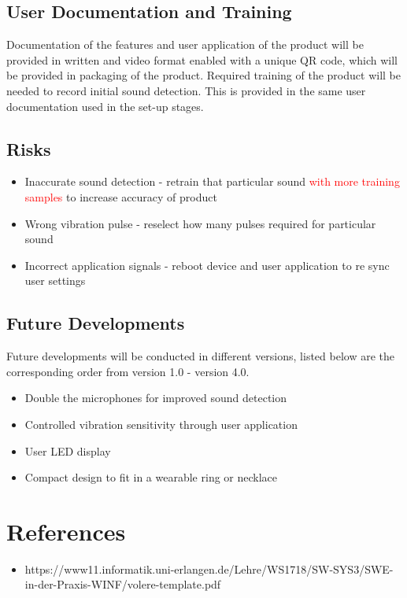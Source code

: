 \documentclass[12pt]{article}
\begin{document}
\raggedright

\subsection{User Documentation and Training}

Documentation of the features and user application of the product will be provided in written and video format enabled with a unique QR code, which will be provided in packaging of the product.
Required training of the product will be needed to record initial sound detection. This is provided in the same user documentation used in the set-up stages.

\subsection{Risks}

\begin{itemize}
  \item Inaccurate sound detection - retrain that particular sound \textcolor{red}{with more training samples} to increase accuracy of product
  \item Wrong vibration pulse - reselect how many pulses required for particular sound
  \item Incorrect application signals - reboot device and user application to re sync user settings
\end{itemize}

\subsection{Future Developments}

Future developments will be conducted in different versions, listed below are the corresponding order from version 1.0 - version 4.0.

\begin{itemize}
  \item Double the microphones for improved sound detection
  \item Controlled vibration sensitivity through user application
  \item User LED display
  \item Compact design to fit in a wearable ring or necklace
\end{itemize}

\pagebreak

\section*{References}
\begin{itemize}
  \item https://www11.informatik.uni-erlangen.de/Lehre/WS1718/SW-SYS3/SWE-in-der-Praxis-WINF/volere-template.pdf
\end{itemize}
\end{document}
